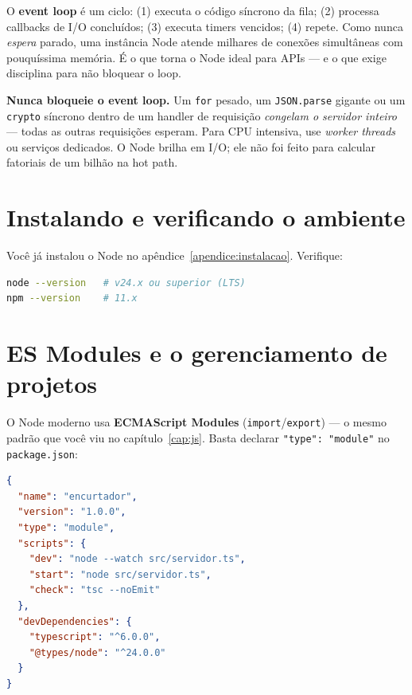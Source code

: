 \begin{caixaconceito}
O \textbf{event loop} é um ciclo: (1) executa o código síncrono da fila;
(2) processa callbacks de I/O concluídos; (3) executa timers vencidos;
(4) repete. Como nunca \emph{espera} parado, uma instância Node atende
milhares de conexões simultâneas com pouquíssima memória. É o que torna o
Node ideal para APIs — e o que exige disciplina para não bloquear o loop.
\end{caixaconceito}

\begin{caixaarmadilha}
\textbf{Nunca bloqueie o event loop.} Um \texttt{for} pesado, um
\texttt{JSON.parse} gigante ou um \texttt{crypto} síncrono dentro de um
handler de requisição \emph{congelam o servidor inteiro} — todas as outras
requisições esperam. Para CPU intensiva, use \emph{worker threads} ou
serviços dedicados. O Node brilha em I/O; ele não foi feito para calcular
fatoriais de um bilhão na hot path.
\end{caixaarmadilha}

\section{Instalando e verificando o ambiente}

Você já instalou o Node no apêndice~\ref{apendice:instalacao}. Verifique:

\begin{lstlisting}[style=livro, language=Bash, caption={Verificação do ambiente.}, label={list:node-verificar}]
node --version   # v24.x ou superior (LTS)
npm --version    # 11.x
\end{lstlisting}

\section{ES Modules e o gerenciamento de projetos}

O Node moderno usa \textbf{ECMAScript Modules} (\texttt{import}/\texttt{export})
— o mesmo padrão que você viu no capítulo~\ref{cap:js}. Basta declarar
\texttt{"type": "module"} no \texttt{package.json}:

\begin{lstlisting}[style=livro, language=JSON,
  caption={package.json com ES Modules e scripts.}, label={list:node-package}]
{
  "name": "encurtador",
  "version": "1.0.0",
  "type": "module",
  "scripts": {
    "dev": "node --watch src/servidor.ts",
    "start": "node src/servidor.ts",
    "check": "tsc --noEmit"
  },
  "devDependencies": {
    "typescript": "^6.0.0",
    "@types/node": "^24.0.0"
  }
}
\end{lstlisting}

